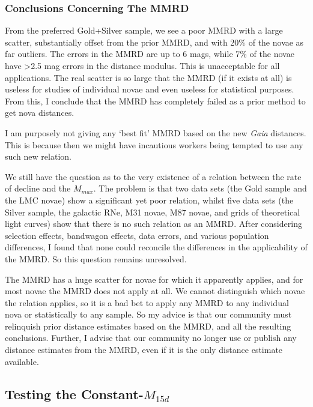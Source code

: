 \documentclass[a4paper,fleqn,usenatbib]{mnras}
\begin{document}
\subsubsection{Conclusions Concerning The MMRD}

From the preferred Gold+Silver sample, we see a poor MMRD with a large scatter, substantially offset from the prior MMRD, and with 20\% of the novae as far outliers.  The errors in the MMRD are up to 6 mags, while 7\% of the novae have >2.5 mag errors in the distance modulus.  This is unacceptable for all applications.  The real scatter is so large that the MMRD (if it exists at all) is useless for studies of individual novae and even useless for statistical purposes.  From this, I conclude that the MMRD has completely failed as a prior method to get nova distances.

I am purposely not giving any `best fit' MMRD based on the new {\it Gaia} distances.  This is because then we might have incautious workers being tempted to use any such new relation. 

We still have the question as to the very existence of a relation between the rate of decline and the $M_{max}$.  The problem is that two data sets (the Gold sample and the LMC novae) show a significant yet poor relation, whilst five data sets (the Silver sample, the galactic RNe, M31 novae, M87 novae, and grids of theoretical light curves) show that there is no such relation as an MMRD.  After considering selection effects, bandwagon effects, data errors, and various population differences, I found that none could reconcile the differences in the applicability of the MMRD.  So this question remains unresolved.

The MMRD has a huge scatter for novae for which it apparently applies, and for most novae the MMRD does not apply at all.  We cannot distinguish which novae the relation applies, so it is a bad bet to apply any MMRD to any individual nova or statistically to any sample.  So my advice is that our community must relinquish prior distance estimates based on the MMRD, and all the resulting conclusions.  Further, I advise that our community no longer use or publish any distance estimates from the MMRD, even if it is the only distance estimate available. 

\subsection{Testing  the Constant-$M_{15d}$}
\end{document}
